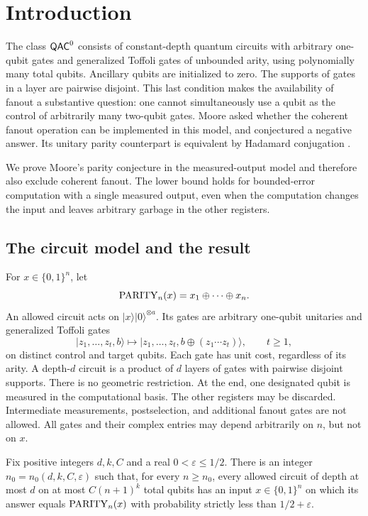 \section{Introduction}
\label{sec:introduction}

The class $\mathsf{QAC}^{0}$ consists of constant-depth quantum circuits with
arbitrary one-qubit gates and generalized Toffoli gates of unbounded
arity, using polynomially many total qubits. Ancillary qubits are initialized
to zero.
The supports of gates in a layer are pairwise disjoint. This last
condition makes the availability of fanout a substantive question:
one cannot simultaneously use a qubit as the control of arbitrarily
many two-qubit gates. Moore asked whether the coherent fanout
operation can be implemented in this model, and conjectured a
negative answer. Its unitary parity counterpart is equivalent
by Hadamard conjugation
\citep{Moore1999,GreenHomerMoorePollett2002}.

We prove Moore's parity conjecture in the measured-output model and
therefore also exclude coherent fanout. The lower bound
holds for bounded-error computation with a single measured output,
even when the computation changes the input and leaves arbitrary
garbage in the other registers.

\subsection{The circuit model and the result}

For $x\in\{0,1\}^{n}$, let
\[
  \mathrm{PARITY}_n(x)=x_1\mathbin{\oplus}\cdots\mathbin{\oplus}x_n.
\]
An allowed circuit acts on $\lvert x\rangle\lvert0\rangle^{\otimes a}$.
Its gates are arbitrary one-qubit unitaries and generalized Toffoli
gates
\[
 \lvert z_1,\ldots,z_t,b\rangle
 \longmapsto
 \lvert z_1,\ldots,z_t,b\mathbin{\oplus}(z_1\cdots z_t)\rangle,
 \qquad t\ge1,
\]
on distinct control and target qubits. Each gate has unit cost,
regardless of its arity. A depth-$d$ circuit is a product of $d$
layers of gates with pairwise disjoint supports. There is no
geometric restriction. At the end, one designated qubit is measured
in the computational basis. The other registers may be discarded.
Intermediate measurements, postselection, and additional fanout
gates are not allowed. All gates and their complex entries may
depend arbitrarily on $n$, but not on $x$.

\begin{theorem}
\label{thm:parity}
Fix positive integers $d,k,C$ and a real $0<\varepsilon\le1/2$.
There is an integer $n_0=n_0(d,k,C,\varepsilon)$ such that,
for every $n\ge n_0$, every allowed circuit of depth at most $d$
on at most $C(n+1)^k$ total qubits has an input $x\in\{0,1\}^{n}$ on which its answer equals
$\mathrm{PARITY}_n(x)$ with probability strictly less than $1/2+\varepsilon$.
\end{theorem}

